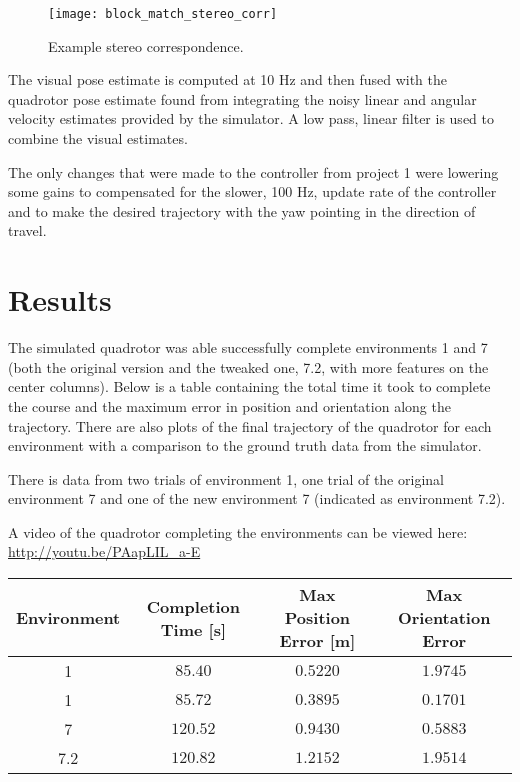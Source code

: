 \documentclass{article}
\begin{document}
  \begin{figure}[H]
    \begin{center}
      \texttt{[image: block\_match\_stereo\_corr]}
    \end{center} 
    \caption{Example stereo correspondence.}
  \end{figure}

  The visual pose estimate is computed at 10 Hz and then fused with the
  quadrotor pose estimate found from integrating the noisy linear and angular
  velocity estimates provided by the simulator. A low pass, linear filter is
  used to combine the visual estimates. 

  The only changes that were made to the controller from project 1 were lowering
  some gains to compensated for the slower, 100 Hz, update rate of the
  controller and to make the desired trajectory with the yaw pointing in the
  direction of travel.

\section{Results}
  
  The simulated quadrotor was able successfully complete environments 1 and 7
  (both the original version and the tweaked one, 7.2, with more features on the
  center columns). Below is a table containing the total time it took to
  complete the course and the maximum error in position and orientation along
  the trajectory. There are also plots of the final trajectory of the quadrotor
  for each environment with a comparison to the ground truth data from the
  simulator.

  There is data from two trials of environment 1, one trial of the original
  environment 7 and one of the new environment 7 (indicated as environment
  7.2).

  A video of the quadrotor completing the environments can be viewed here:
  \url{http://youtu.be/PAapLIL_a-E}

\begin{center}
  \begin{tabular}{|c|c|c|c|}
    \hline
    Environment & Completion Time [s] & Max Position Error [m] & Max Orientation Error \\
    \hline
    1         & $85.40 $ &  $0.5220$ & $1.9745$ \\
    1         & $85.72 $ &  $0.3895$ & $0.1701$ \\
    7         & $120.52$ &  $0.9430$ & $0.5883$ \\
    7.2       & $120.82$ &  $1.2152$ & $1.9514$ \\
    \hline
  \end{tabular}
  \label{tab:myfirsttable}
\end{center}
\end{document}
